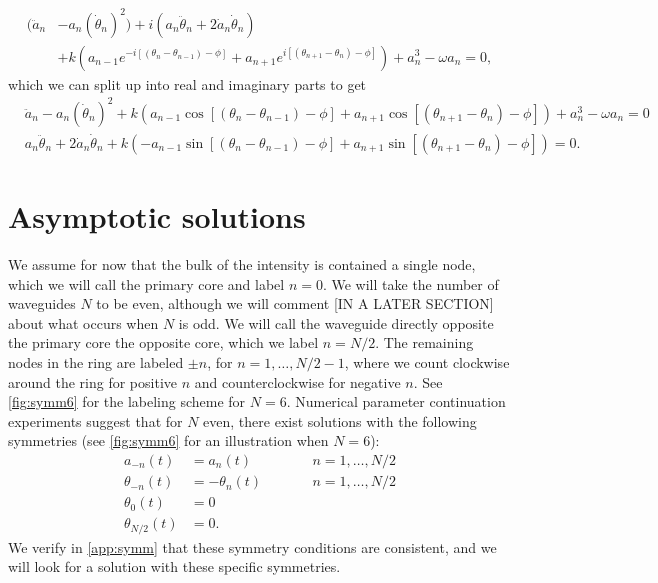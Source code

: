 \documentclass[11pt,reqno]{amsart}
\begin{document}
\begin{equation}\label{eq:st2}
\begin{aligned}
(\ddot a_n &- a_n (\dot \theta_n)^2) 
+ i ( a_n \ddot\theta_n + 2 \dot a_n \dot \theta_n )\\
&+ k\left(a_{n-1}e^{-i[(\theta_n - \theta_{n-1}) - \phi]} + a_{n+1}e^{i[(\theta_{n+1} - \theta_{n}) - \phi]} \right)+a_n^3 - \omega a_n = 0,
\end{aligned}
\end{equation}  
which we can split up into real and imaginary parts to get
\begin{align}
&\ddot a_n - a_n (\dot \theta_n)^2 +
 k\left(a_{n-1}\cos[(\theta_n - \theta_{n-1}) - \phi] + a_{n+1}\cos[(\theta_{n+1} - \theta_{n}) - \phi] \right)+a_n^3 - \omega a_n = 0 \label{eq:st2real} \\
&a_n \ddot\theta_n + 2 \dot a_n \dot \theta_n
+ k\left(-a_{n-1}\sin[(\theta_n - \theta_{n-1}) - \phi] + a_{n+1}\sin [(\theta_{n+1} - \theta_{n}) - \phi] \right) = 0. \label{eq:st2imag}
\end{align}

\section{Asymptotic solutions}\label{sec:asymp}

We assume for now that the bulk of the intensity is contained a single node, which we will call the primary core and label $n=0$. We will take the number of waveguides $N$ to be even, although we will comment [IN A LATER SECTION] about what occurs when $N$ is odd. We will call the waveguide directly opposite the primary core the opposite core, which we label $n=N/2$. The remaining nodes in the ring are labeled $\pm n$, for $n = 1, \dots, N/2-1$, where we count clockwise around the ring for positive $n$ and counterclockwise for negative $n$. See \cref{fig:symm6} for the labeling scheme for $N=6$. Numerical parameter continuation experiments suggest that for $N$ even, there exist solutions with the following symmetries (see \cref{fig:symm6} for an illustration when $N=6$):
\begin{equation}\label{eq:symm}
\begin{aligned}
a_{-n}(t) &= a_{n}(t) && \qquad n = 1, \dots, N/2 \\
\theta_{-n}(t) &= -\theta_{n}(t) && \qquad n = 1, \dots, N/2 \\
\theta_0(t) &= 0 \\
\theta_{N/2}(t) &= 0.
\end{aligned}
\end{equation} 
We verify in \cref{app:symm} that these symmetry conditions are consistent, and we will look for a solution with these specific symmetries. 
\end{document}
